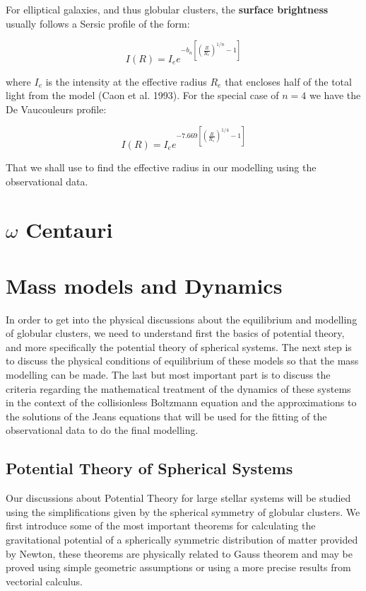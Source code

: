 For elliptical galaxies, and thus globular clusters, the \textbf{surface brightness} usually follows a Sersic profile of the form: 

\begin{equation}
I(R)=I_{e}e^{-b_{n}\left[\left(\frac{R}{R_{e}}\right)^{1/n}-1\right]}
\end{equation}

where $I_{e}$ is the intensity at the effective radius $R_{e}$ that encloses half of the total light from the model (Caon et al. 1993). For the special case of $n=4$ we have the De Vaucouleurs profile:

\begin{equation}
I(R)=I_{e}e^{-7.669\left[\left(\frac{R}{R_{e}}\right)^{1/4}-1\right]}
\end{equation}

That we shall use to find the effective radius in our modelling using the observational data.

\section{$\omega$ Centauri}

\section{Mass models and Dynamics}

In order to get into the physical discussions about the equilibrium and modelling of globular clusters, we need to understand first the basics of potential theory, and more specifically the potential theory of spherical systems. The next step is to discuss the physical conditions of equilibrium of these models so that the mass modelling can be made. The last but most important part is to discuss the criteria regarding the mathematical treatment of the dynamics of these systems in the context of the collisionless Boltzmann equation and the approximations to the solutions of the Jeans equations that will be used for the fitting of the observational data to do the final modelling.

\subsection{Potential Theory of Spherical Systems}

Our discussions about Potential Theory for large stellar systems will be studied using the simplifications given by the spherical symmetry of globular clusters. We first introduce some of the most important theorems for calculating the gravitational potential of a spherically symmetric distribution of matter provided by Newton, these theorems are physically related to Gauss theorem and may be proved using simple geometric assumptions or using a more precise results from vectorial calculus.


